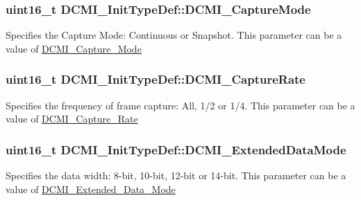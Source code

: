 \subsubsection[{D\+C\+M\+I\+\_\+\+Capture\+Mode}]{\setlength{\rightskip}{0pt plus 5cm}uint16\+\_\+t D\+C\+M\+I\+\_\+\+Init\+Type\+Def\+::\+D\+C\+M\+I\+\_\+\+Capture\+Mode}\label{struct_d_c_m_i___init_type_def_ad2c303b2a56112ab1b507d972dc70514}
Specifies the Capture Mode\+: Continuous or Snapshot. This parameter can be a value of \hyperlink{group___d_c_m_i___capture___mode}{D\+C\+M\+I\+\_\+\+Capture\+\_\+\+Mode} \hypertarget{struct_d_c_m_i___init_type_def_ada6d27385f753e9776df18bd76faf5ab}{}
\subsubsection[{D\+C\+M\+I\+\_\+\+Capture\+Rate}]{\setlength{\rightskip}{0pt plus 5cm}uint16\+\_\+t D\+C\+M\+I\+\_\+\+Init\+Type\+Def\+::\+D\+C\+M\+I\+\_\+\+Capture\+Rate}\label{struct_d_c_m_i___init_type_def_ada6d27385f753e9776df18bd76faf5ab}
Specifies the frequency of frame capture\+: All, 1/2 or 1/4. This parameter can be a value of \hyperlink{group___d_c_m_i___capture___rate}{D\+C\+M\+I\+\_\+\+Capture\+\_\+\+Rate} \hypertarget{struct_d_c_m_i___init_type_def_a9b4d6a13bf652b0683240d269015ff7c}{}
\subsubsection[{D\+C\+M\+I\+\_\+\+Extended\+Data\+Mode}]{\setlength{\rightskip}{0pt plus 5cm}uint16\+\_\+t D\+C\+M\+I\+\_\+\+Init\+Type\+Def\+::\+D\+C\+M\+I\+\_\+\+Extended\+Data\+Mode}\label{struct_d_c_m_i___init_type_def_a9b4d6a13bf652b0683240d269015ff7c}
Specifies the data width\+: 8-\/bit, 10-\/bit, 12-\/bit or 14-\/bit. This parameter can be a value of \hyperlink{group___d_c_m_i___extended___data___mode}{D\+C\+M\+I\+\_\+\+Extended\+\_\+\+Data\+\_\+\+Mode} \hypertarget{struct_d_c_m_i___init_type_def_ab9f87fbe99bdd7f38700379896175512}{}

